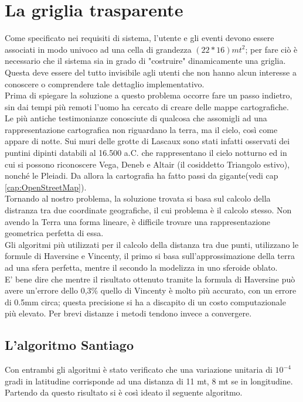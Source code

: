 \newpage
\section{La griglia trasparente}
Come specificato nei requisiti di sistema, l'utente e gli eventi devono essere associati in modo univoco ad una cella di grandezza $(22*16)mt^{2}$; per fare ciò è necessario che il sistema sia in grado di "costruire" dinamicamente una griglia. Questa deve essere del tutto invisibile agli utenti che non hanno alcun interesse a conoscere o comprendere tale dettaglio implementativo.\\
Prima di spiegare la soluzione a questo problema occorre fare un passo indietro, sin dai tempi più remoti l'uomo ha cercato di creare delle mappe cartografiche. Le più antiche testimonianze \cite{GROTTE} conosciute di qualcosa che assomigli ad una rappresentazione cartografica non riguardano la terra, ma il cielo, così come appare di notte. Sui muri delle grotte di Lascaux sono stati infatti osservati dei puntini dipinti databili al 16.500 a.C. che rappresentano il cielo notturno ed in cui si possono riconoscere Vega, Deneb e Altair (il cosiddetto Triangolo estivo), nonché le Pleiadi. Da allora la cartografia ha fatto passi da gigante(vedi cap \ref{cap:OpenStreetMap}).\\
Tornando al nostro problema, la soluzione trovata si basa sul calcolo della distranza tra due coordinate geografiche, il cui problema è il calcolo stesso. Non avendo la Terra una forma lineare, è difficile trovare una rappresentazione geometrica perfetta di essa. \\
Gli algoritmi più utilizzati per il calcolo della distanza tra due punti, utilizzano le formule di Haversine e Vincenty, il primo si basa sull'approssimazione della terra ad una sfera perfetta, mentre il secondo la modelizza in uno sferoide oblato. \\
E' bene dire che mentre il risultato ottenuto tramite la formula di Haversine può avere un'errore dello 0,3\%  quello di Vincenty è molto più accurato, con un errore di 0.5mm circa; questa precisione si ha a discapito di un costo computazionale più elevato. Per brevi distanze i metodi tendono invece a convergere.
\newpage
\subsection{L'algoritmo Santiago}
\label{santiago}
Con entrambi gli algoritmi è stato verificato che una variazione unitaria di $10^{-4} $ gradi in latitudine corrisponde ad una distanza di 11 mt, 8 mt se in longitudine. Partendo da questo risultato si è così ideato il seguente algoritmo.

